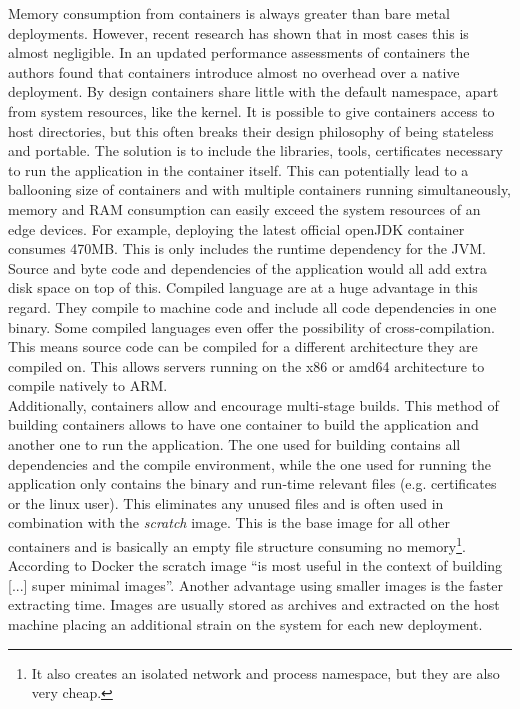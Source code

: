Memory consumption from containers is always greater than bare metal deployments. However, recent research has shown that in most cases this is almost negligible. In an updated performance assessments of containers the authors found that containers introduce almost no overhead over a native deployment\cite{felter2015updatedPerformanceContainers}. By design containers share little with the default namespace, apart from system resources, like the kernel. It is possible to give containers access to host directories, but this often breaks their design philosophy of being stateless and portable. The solution is to include the libraries, tools, certificates necessary to run the application in the container itself. This can potentially lead to a ballooning size of containers and with multiple containers running simultaneously, memory and RAM consumption can easily exceed the system resources of an edge devices. For example, deploying the latest official openJDK container consumes 470MB. This is only includes the runtime dependency for the JVM. Source and byte code and dependencies of the application would all add extra disk space on top of this. Compiled language are at a huge advantage in this regard. They compile to machine code and include all code dependencies in one binary. Some compiled languages even offer the possibility of cross-compilation. This means source code can be compiled for a different architecture they are compiled on. This allows servers running on the x86 or amd64 architecture to compile natively to ARM.\\
Additionally, containers allow and encourage multi-stage builds. This method of building containers allows to have one container to build the application and another one to run the application. The one used for building contains all dependencies and the compile environment, while the one used for running the application only contains the binary and run-time relevant files (e.g. certificates or the linux user). This eliminates any unused files and is often used in combination with the \textit{scratch} image. This is the base image for all other containers and is basically an empty file structure consuming no memory\footnote{It also creates an isolated network and process namespace, but they are also very cheap.}. According to Docker the scratch image ``is most useful in the context of building [...] super minimal images''\cite{scratchImageDockerD65:online}. Another advantage using smaller images is the faster extracting time. Images are usually stored as archives and extracted on the host machine placing an additional strain on the system for each new deployment. \\


